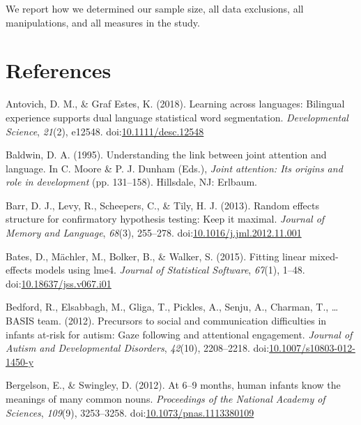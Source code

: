 \documentclass[,man,floatsintext]{apa6}
\begin{document}
We report how we determined our sample size, all data exclusions, all manipulations, and all measures in the study.

\newpage

\hypertarget{references}{%
\section{References}\label{references}}

\begingroup
\setlength{\parindent}{-0.5in}
\setlength{\leftskip}{0.5in}

\hypertarget{refs}{}
\leavevmode\hypertarget{ref-Antovich_GrafEstes_2017}{}%
Antovich, D. M., \& Graf Estes, K. (2018). Learning across languages: Bilingual experience supports dual language statistical word segmentation. \emph{Developmental Science}, \emph{21}(2), e12548. doi:\href{https://doi.org/10.1111/desc.12548}{10.1111/desc.12548}

\leavevmode\hypertarget{ref-Baldwin_1995}{}%
Baldwin, D. A. (1995). Understanding the link between joint attention and language. In C. Moore \& P. J. Dunham (Eds.), \emph{Joint attention: Its origins and role in development} (pp. 131--158). Hillsdale, NJ: Erlbaum.

\leavevmode\hypertarget{ref-Barr_etal_2013}{}%
Barr, D. J., Levy, R., Scheepers, C., \& Tily, H. J. (2013). Random effects structure for confirmatory hypothesis testing: Keep it maximal. \emph{Journal of Memory and Language}, \emph{68}(3), 255--278. doi:\href{https://doi.org/10.1016/j.jml.2012.11.001}{10.1016/j.jml.2012.11.001}

\leavevmode\hypertarget{ref-Bates_etal_2015}{}%
Bates, D., Mächler, M., Bolker, B., \& Walker, S. (2015). Fitting linear mixed-effects models using lme4. \emph{Journal of Statistical Software}, \emph{67}(1), 1--48. doi:\href{https://doi.org/10.18637/jss.v067.i01}{10.18637/jss.v067.i01}

\leavevmode\hypertarget{ref-Bedford_etal_2012}{}%
Bedford, R., Elsabbagh, M., Gliga, T., Pickles, A., Senju, A., Charman, T., \ldots{} BASIS team. (2012). Precursors to social and communication difficulties in infants at-risk for autism: Gaze following and attentional engagement. \emph{Journal of Autism and Developmental Disorders}, \emph{42}(10), 2208--2218. doi:\href{https://doi.org/10.1007/s10803-012-1450-y}{10.1007/s10803-012-1450-y}

\leavevmode\hypertarget{ref-Bergelson_Swingley_2012}{}%
Bergelson, E., \& Swingley, D. (2012). At 6--9 months, human infants know the meanings of many common nouns. \emph{Proceedings of the National Academy of Sciences}, \emph{109}(9), 3253--3258. doi:\href{https://doi.org/10.1073/pnas.1113380109}{10.1073/pnas.1113380109}
\end{document}

